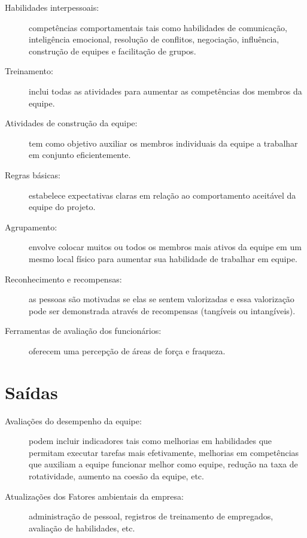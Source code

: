 \begin{description}
	
	\item[Habilidades interpessoais:] competências comportamentais tais como habilidades de comunicação, inteligência emocional, resolução de conflitos, negociação, influência, construção de equipes e facilitação de grupos.
	
	\item[Treinamento:] inclui todas as atividades para aumentar as competências dos membros da equipe.
	
	\item[Atividades de construção da equipe:] tem como objetivo auxiliar os membros individuais da equipe a trabalhar em conjunto eficientemente.
	
	\item[Regras básicas:] estabelece expectativas claras em relação ao comportamento aceitável da equipe do projeto.
	
	\item[Agrupamento:] envolve colocar muitos ou todos os membros mais ativos da equipe em um mesmo local físico para aumentar sua habilidade de trabalhar em equipe.
	
	\item[Reconhecimento e recompensas:] as pessoas são motivadas se elas se sentem valorizadas e essa valorização pode ser demonstrada através de recompensas (tangíveis ou intangíveis).
	
	\item[Ferramentas de avaliação dos funcionários:] oferecem uma percepção de áreas de força e fraqueza.
	
\end{description}

\section{Saídas}

\begin{description}
	
	\item[Avaliações do desempenho da equipe:] podem incluir indicadores tais como melhorias em habilidades que permitam executar tarefas mais efetivamente, melhorias em competências que auxiliam a equipe funcionar melhor como equipe, redução na taxa de rotatividade, aumento na coesão da equipe, etc.
	
	\item[Atualizações dos Fatores ambientais da empresa:] administração de pessoal, registros de treinamento de empregados, avaliação de habilidades, etc.
	
\end{description}

